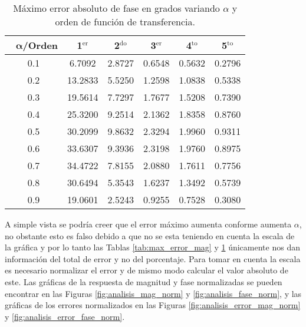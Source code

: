 \begin{table}[!hbp]                                 
\centering            
\caption{Máximo error absoluto de fase en grados variando $\alpha$ y orden de función de transferencia.}                           
\label{tab:max_error_fase}                               
\begin{tabular}{cccccc}
\hline                                             
$\,\,\,\,\bm{\alpha}$\textbf{/Orden} & \textbf{1$^{\mathrm{er}}$} & \textbf{2$^{\mathrm{do}}$} & \textbf{3$^{\mathrm{er}}$} & \textbf{4$^{\mathrm{to}}$} & \textbf{5$^{\mathrm{to}}$} \\                     
\hline                                             
0.1 & 6.7092 & 2.8727 & 0.6548 & 0.5632 & 0.2796 \\ 
                                             
0.2 & 13.2833 & 5.5250 & 1.2598 & 1.0838 & 0.5338 \\
                                            
0.3 & 19.5614 & 7.7297 & 1.7677 & 1.5208 & 0.7390 \\
                                              
0.4 & 25.3200 & 9.2514 & 2.1362 & 1.8358 & 0.8760 \\
                                            
0.5 & 30.2099 & 9.8632 & 2.3294 & 1.9960 & 0.9311 \\
                                             
0.6 & 33.6307 & 9.3936 & 2.3198 & 1.9760 & 0.8975 \\
                                             
0.7 & 34.4722 & 7.8155 & 2.0880 & 1.7611 & 0.7756 \\
                                             
0.8 & 30.6494 & 5.3543 & 1.6237 & 1.3492 & 0.5739 \\
                                             
0.9 & 19.0601 & 2.5243 & 0.9255 & 0.7528 & 0.3080 \\
\hline                                             
\end{tabular}                                                             
\end{table}

	A simple vista se podría creer que el error máximo aumenta conforme aumenta $\alpha$, no obstante esto es falso debido a que no se esta teniendo en cuenta la escala de la gráfica y por lo tanto las Tablas \ref{tab:max_error_mag} y \ref{tab:max_error_fase} únicamente nos dan información del total de error y no del porcentaje. Para tomar en cuenta la escala es necesario normalizar el error y de mismo modo calcular el valor absoluto de este. Las gráficas de la respuesta de magnitud y fase normalizadas se pueden encontrar en las Figuras \ref{fig:analisis_mag_norm} y \ref{fig:analisis_fase_norm}, y las gráficas de los errores normalizados en las Figuras \ref{fig:analisis_error_mag_norm} y \ref{fig:analisis_error_fase_norm}.
	
